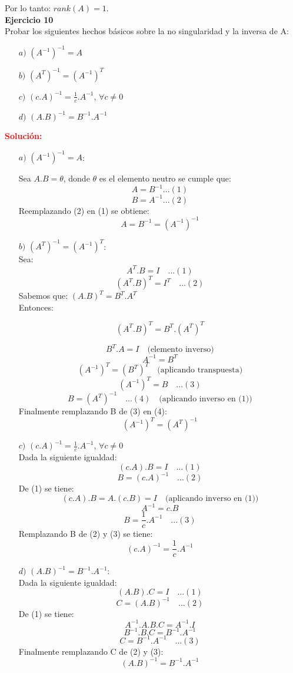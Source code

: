 \documentclass[12pt]{article}
\begin{document}
Por lo tanto: $rank(A)=1$.\\

\noindent \textbf{Ejercicio 10} \\
Probar los siguientes hechos básicos sobre la no singularidad  y la inversa de A:
\begin{enumerate}
    \item[$a)$] $(A^{-1})^{-1}=A$
    \item[$b)$] $(A^T)^{-1}=(A^{-1})^T$
    \item[$c)$] $(c.A)^{-1}=\frac{1}{c}.A^{-1}$, $\forall c \neq 0$
    \item[$d)$] $(A.B)^{-1}=B^{-1}.A^{-1}$
\end{enumerate}

\noindent \textcolor{red}{\bf Solución:}\\

\begin{enumerate}
\item[$a)$] $(A^{-1})^{-1}=A$:

Sea $A.B=\theta$, donde $\theta$ es el elemento neutro se cumple que:
$$A=B^{-1}...(1)$$
$$B=A^{-1}...(2)$$
Reemplazando (2) en (1) se obtiene:
$$A=B^{-1}=(A^{-1})^{-1}$$

\item[$b)$] $(A^T)^{-1}=(A^{-1})^T$:\\

Sea:
$$A^{T}.B=I\quad...(1)$$
$$(A^T.B)^T=I^T\quad...(2)$$
Sabemos que: $(A.B)^T=B^T.A^T$\\
Entonces:

$$(A^T.B)^T=B^T.(A^T)^T$$

$$B^T.A=I \quad \text{(elemento inverso)}$$
$$A^{-1}=B^T $$
$$(A^{-1})^T=(B^T)^T \quad \text{(aplicando transpuesta)}$$
$$(A^{-1})^T=B \quad...(3)$$
$$B=(A^T)^{-1}\quad...(4) \quad \text{(aplicando inverso en (1))}$$
Finalmente remplazando B de (3) en (4):\\
$$(A^{-1})^T=(A^T)^{-1}$$

\item[$c)$] $(c.A)^{-1}=\frac{1}{c}.A^{-1}$, $\forall c \neq 0$\\
Dada la siguiente igualdad:
$$(c.A).B=I\quad...(1)$$
$$B=(c.A)^{-1}\quad...(2)$$
De (1) se tiene:
$$(c.A).B=A.(c.B)=I \quad \text{(aplicando inverso en (1))}$$
$$A^{-1}=c.B$$
$$B=\frac{1}{c}.A^{-1}\quad...(3)$$
Remplazando B de (2) y (3) se tiene:\\
$$(c.A)^{-1}=\frac{1}{c}.A^{-1}$$

\item[$d)$] $(A.B)^{-1}=B^{-1}.A^{-1}$:\\

Dada la siguiente igualdad:
$$(A.B).C=I\quad...(1)$$
$$C=(A.B)^{-1}\quad...(2)$$
De (1) se tiene:
$$A^{-1}.A.B.C=A^{-1}.I$$
$$B^{-1}.B.C=B^{-1}.A^{-1}$$
$$C=B^{-1}.A^{-1}\quad...(3)$$
Finalmente remplazando C de (2) y (3):\\
$$(A.B)^{-1}=B^{-1}.A^{-1}$$

\end{enumerate}
\end{document}
